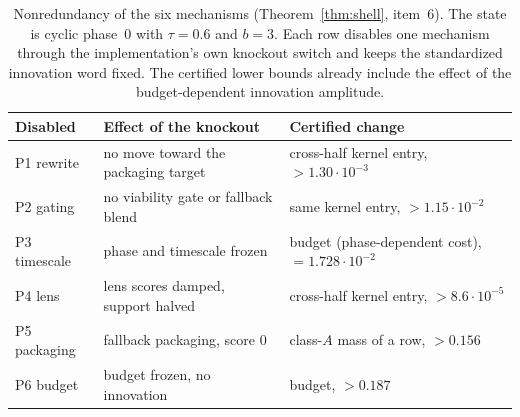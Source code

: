 \begin{table}[t]
\caption{Nonredundancy of the six mechanisms (Theorem~\ref{thm:shell}, item~6). The state is cyclic phase~$0$ with $\tau=0.6$ and $b=3$. Each row disables one mechanism through the implementation's own knockout switch and keeps the standardized innovation word fixed. The certified lower bounds already include the effect of the budget-dependent innovation amplitude.}
\label{tbl:nonredundancy}
\centering
\small
\begin{tabular}{@{}l l l@{}}
\toprule
Disabled & Effect of the knockout & Certified change \\
\midrule
P1 rewrite & no move toward the packaging target & cross-half kernel entry, $>1.30\cdot10^{-3}$ \\
P2 gating & no viability gate or fallback blend & same kernel entry, $>1.15\cdot10^{-2}$ \\
P3 timescale & phase and timescale frozen & budget (phase-dependent cost), $=1.728\cdot10^{-2}$ \\
P4 lens & lens scores damped, support halved & cross-half kernel entry, $>8.6\cdot10^{-5}$ \\
P5 packaging & fallback packaging, score $0$ & class-$A$ mass of a row, $>0.156$ \\
P6 budget & budget frozen, no innovation & budget, $>0.187$ \\
\bottomrule
\end{tabular}
\end{table}
